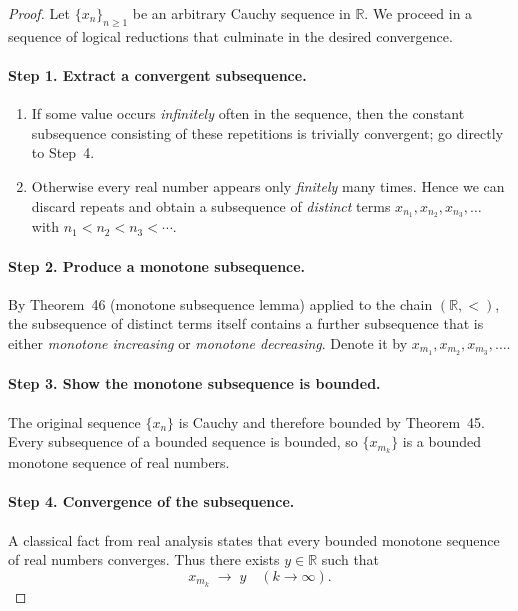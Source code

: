 \documentclass[12pt]{article}
\theoremstyle{definition} %
\theoremstyle{plain} %
\begin{document}
\begin{proof}
  Let $\{x_n\}_{n\ge 1}$ be an arbitrary Cauchy sequence in $\mathbb R$.
  We proceed in a sequence of logical reductions that culminate in the
  desired convergence.

  \paragraph{\textbf{Step 1.}  Extract a convergent subsequence.}
  \begin{enumerate}[label=\arabic*.]
      \item If some value occurs \emph{infinitely} often in the sequence,
            then the constant subsequence consisting of these repetitions
            is trivially convergent; go directly to Step 4.
      \item Otherwise every real number appears only \emph{finitely}
            many times.  Hence we can discard repeats and obtain a
            subsequence of \emph{distinct} terms
            \(
                x_{n_1},x_{n_2},x_{n_3},\dots
            \)
            with $n_1<n_2<n_3<\cdots$.
  \end{enumerate}

  \paragraph{\textbf{Step 2.}  Produce a monotone subsequence.}
  By Theorem 46 (monotone subsequence lemma) applied to the chain
  $(\mathbb R,<)$, the subsequence of distinct terms itself contains
  a further subsequence that is either \emph{monotone increasing}
  or \emph{monotone decreasing}.  Denote it by
  \(
      x_{m_1},x_{m_2},x_{m_3},\dots
  \).

  \paragraph{\textbf{Step 3.}  Show the monotone subsequence is bounded.}
  The original sequence $\{x_n\}$ is Cauchy and therefore bounded by
  Theorem 45.  Every subsequence of a bounded sequence is bounded, so
  $\{x_{m_k}\}$ is a bounded monotone sequence of real numbers.

  \paragraph{\textbf{Step 4.}  Convergence of the subsequence.}
  A classical fact from real analysis states that every bounded monotone
  sequence of real numbers converges.  Thus there exists
  $y\in\mathbb R$ such that
  \[
      x_{m_k}\;\longrightarrow\; y\quad(k\to\infty).
  \]


\end{proof}
\end{document}
